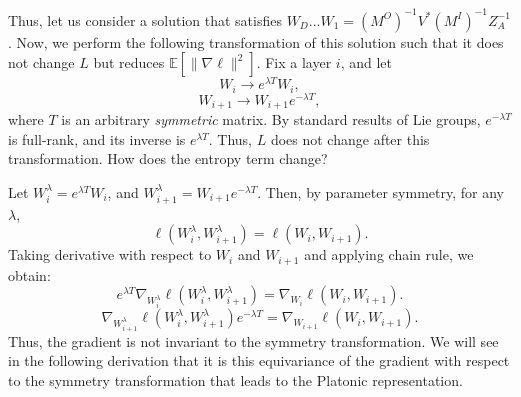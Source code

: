 \documentclass[11pt]{article}
\theoremstyle{plain}
\newcommand{\E}{\mathbb{E}}
\begin{document}
Thus, let us consider a solution that satisfies $W_D...W_1 = (M^O)^{-1} V^* (M^I)^{-1} Z_A^{-1}$. Now, we perform the following transformation of this solution such that it does not change $L$ but reduces $\E[\|\nabla\ell\|^2]$. Fix a layer $i$, and let 
\begin{equation}
    W_i \to e^{\lambda T} W_i, 
\end{equation}
\begin{equation}
    W_{i+1} \to  W_{i+1} e^{-\lambda T},
\end{equation}
where $T$ is an arbitrary \textit{symmetric} matrix. By standard results of Lie groups, $e^{-\lambda T}$ is full-rank, and its inverse is $e^{\lambda T}$. Thus, $L$ does not change after this transformation. How does the entropy term change?  %

Let $W_i^\lambda = e^{\lambda T}W_i$, and $W_{i+1}^\lambda = W_{i+1}e^{-\lambda T}$. Then, by parameter symmetry, for any $\lambda$,
\begin{equation}
    \ell(W_i^\lambda , W_{i+1}^\lambda) = \ell(W_i, W_{i+1}).
\end{equation}
Taking derivative with respect to $W_i$ and $W_{i+1}$ and applying chain rule, we obtain:
\begin{equation}
\boxed{
    e^{\lambda T} \nabla_{W_i^\lambda} \ell(W_i^\lambda , W_{i+1}^\lambda) = \nabla_{W_i}\ell(W_i, W_{i+1}).}
\end{equation}
\begin{equation}
    \boxed{\nabla_{W_{i+1}^\lambda} \ell(W_i^\lambda , W_{i+1}^\lambda) e^{-\lambda T}  = \nabla_{W_{i+1}}\ell(W_i, W_{i+1}).}
\end{equation}
Thus, the gradient is not invariant to the symmetry transformation. We will see in the following derivation that it is this equivariance of the gradient with respect to the symmetry transformation that leads to the Platonic representation. 

\end{document}
